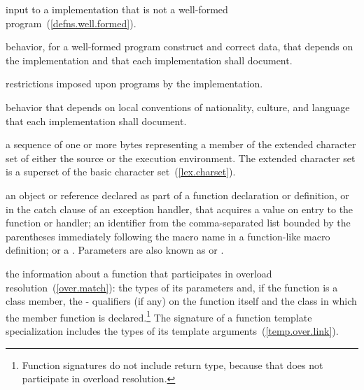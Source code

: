 %
input to a \Cpp implementation that is not a
well-formed program~(\ref{defns.well.formed}).

%
behavior, for a well-formed program construct and correct data, that
depends on the implementation and that each implementation shall document.

%
restrictions imposed upon programs by the implementation.

%
behavior that depends on local conventions of nationality, culture, and
language that each implementation shall document.

%
a sequence of one or more bytes representing a member of the extended
character set of either the source or the execution environment.
The extended character set is a superset of the basic character
set~(\ref{lex.charset}).

%
%
%
%
%
an object or reference declared as part of a function declaration or
definition, or in the catch clause of an exception handler, that
acquires a value on entry to the function or handler;
an identifier from
the comma-separated list bounded by the parentheses immediately
following the macro name in a function-like macro definition; or
a .
Parameters are also known as
 or
.

%
the information about a function that participates in
overload resolution~(\ref{over.match}): the types of its parameters and,
if the function is a class member, the \cv- qualifiers (if any) on the function
itself and the class in which the member function is declared.\footnote{
Function signatures do not include return type, because that does not
participate in overload resolution.}
The signature of a function template specialization includes the types of
its template arguments~(\ref{temp.over.link}).

